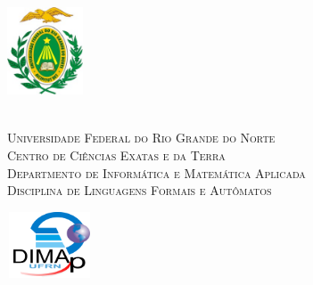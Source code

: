 
\begin{titlepage}
	\begin{center}

		\begin{minipage}{2.3cm}
			\begin{center}
				\includegraphics[width=2.25cm, height=2.68cm]{Imagens/Brasao-UFRN.jpg}
			\end{center}
		\end{minipage}
		\begin{minipage}{11.15cm}
			\begin{center}
				\begin{espacosimples}
					{\small \ \\
						\textsc{Universidade Federal do Rio Grande do Norte}		   			\\
						\textsc{Centro de Ciências Exatas e da Terra}					\\
						\textsc{Departmento de Informática e Matemática Aplicada}	   	\\
						\textsc{Disciplina de Linguagens Formais e Autômatos}}   				\\
				\end{espacosimples}
			\end{center}
		\end{minipage}
		\begin{minipage}{2.3cm}
			\begin{center}
				\includegraphics[width=2.52cm, height=1.96cm]{Imagens/Logotipo-DIMAp.png}
			\end{center}
		\end{minipage}


\end{center}
\end{titlepage}
